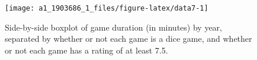 \documentclass[
]{article}
\begin{document}
\begin{figure}

{\centering \texttt{[image: a1\_1903686\_1\_files/figure-latex/data7-1]} 

}

\caption{Side-by-side boxplot of game duration (in minutes) by year, separated by whether or not each game is a dice game, and whether or not each game has a rating of at least 7.5.}\label{fig:data7}
\end{figure}
\end{document}
